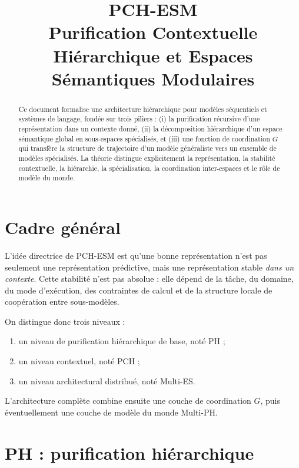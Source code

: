 \documentclass[11pt,a4paper]{article}
\title{PCH-ESM\\
\large Purification Contextuelle Hiérarchique et Espaces Sémantiques Modulaires}
\author{}
\date{}
\newcommand{\1}{\mathbf 1}
\begin{document}
\maketitle

\begin{abstract}
Ce document formalise une architecture hiérarchique pour modèles séquentiels et systèmes de langage, fondée sur trois piliers :
(i) la purification récursive d'une représentation dans un contexte donné,
(ii) la décomposition hiérarchique d'un espace sémantique global en sous-espaces spécialisés,
et (iii) une fonction de coordination \(G\) qui transfère la structure de trajectoire d'un modèle généraliste vers un ensemble de modèles spécialisés.
La théorie distingue explicitement la représentation, la stabilité contextuelle, la hiérarchie, la spécialisation, la coordination inter-espaces et le rôle de modèle du monde.
\end{abstract}

\tableofcontents

\section{Cadre général}

L'idée directrice de PCH-ESM est qu'une bonne représentation n'est pas seulement une représentation prédictive, mais une représentation stable \emph{dans un contexte}.
Cette stabilité n'est pas absolue : elle dépend de la tâche, du domaine, du mode d'exécution, des contraintes de calcul et de la structure locale de coopération entre sous-modèles.

On distingue donc trois niveaux :

\begin{enumerate}[leftmargin=2em]
    \item un niveau de purification hiérarchique de base, noté PH ;
    \item un niveau contextuel, noté PCH ;
    \item un niveau architectural distribué, noté Multi-ES.
\end{enumerate}

L'architecture complète combine ensuite une couche de coordination \(G\), puis éventuellement une couche de modèle du monde Multi-PH.

\section{PH : purification hiérarchique}
\end{document}
